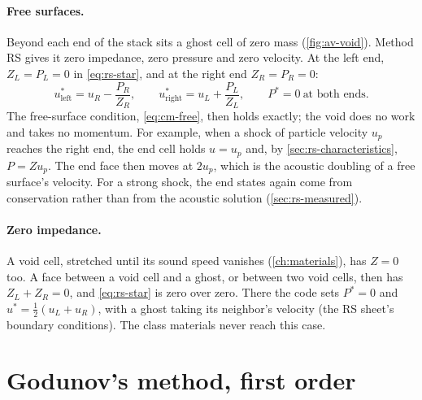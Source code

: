 \paragraph{Free surfaces.} Beyond each end of the stack sits a ghost cell of
zero mass (\cref{fig:av-void}). Method RS gives it zero impedance, zero
pressure and zero velocity. At the left end, $Z_L = P_L = 0$ in
\cref{eq:rs-star}, and at the right end $Z_R = P_R = 0$:
\begin{equation}
u^*_{\mathrm{left}} = u_R - \frac{P_R}{Z_R},
\qquad
u^*_{\mathrm{right}} = u_L + \frac{P_L}{Z_L},
\qquad
P^* = 0 \ \text{at both ends}.
\label{eq:rs-free}
\end{equation}
The free-surface condition, \cref{eq:cm-free}, then holds exactly; the void
does no work and takes no momentum. For example, when a shock of particle
velocity $u_p$ reaches the right end, the end cell holds $u = u_p$ and, by
\cref{sec:rs-characteristics}, $P = Z u_p$. The end face then moves at
$2u_p$, which is the acoustic doubling of a free surface's velocity. For a
strong shock, the end states again come from conservation rather than from
the acoustic solution (\cref{sec:rs-measured}).

\paragraph{Zero impedance.} A void cell, stretched until its sound speed
vanishes (\cref{ch:materials}), has $Z = 0$ too. A face between a void cell
and a ghost, or between two void cells, then has $Z_L + Z_R = 0$, and
\cref{eq:rs-star} is zero over zero. There the code sets $P^* = 0$ and
$u^* = \tfrac{1}{2}(u_L + u_R)$, with a ghost taking its neighbor's
velocity (the RS sheet's boundary conditions). The class materials never
reach this case.

\section{Godunov's method, first order}
\label{sec:rs-first-order}


